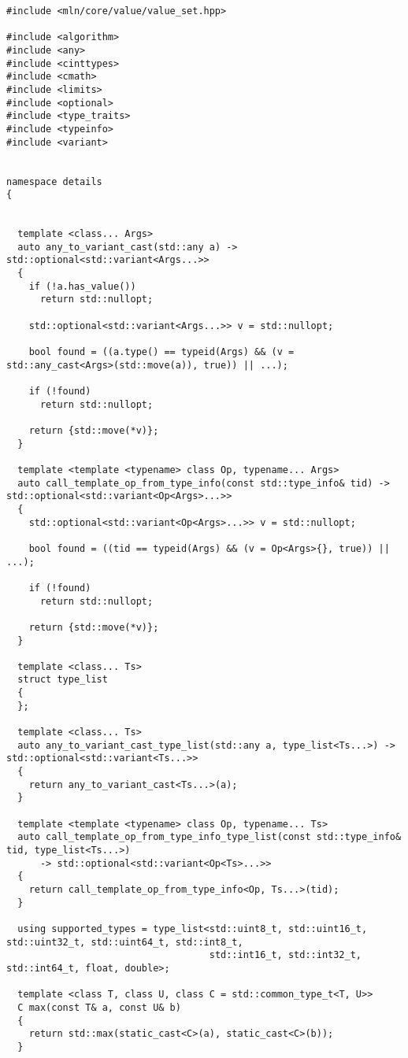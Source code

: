 \begin{verbatim}
#include <mln/core/value/value_set.hpp>

#include <algorithm>
#include <any>
#include <cinttypes>
#include <cmath>
#include <limits>
#include <optional>
#include <type_traits>
#include <typeinfo>
#include <variant>


namespace details
{


  template <class... Args>
  auto any_to_variant_cast(std::any a) -> std::optional<std::variant<Args...>>
  {
    if (!a.has_value())
      return std::nullopt;

    std::optional<std::variant<Args...>> v = std::nullopt;

    bool found = ((a.type() == typeid(Args) && (v = std::any_cast<Args>(std::move(a)), true)) || ...);

    if (!found)
      return std::nullopt;

    return {std::move(*v)};
  }

  template <template <typename> class Op, typename... Args>
  auto call_template_op_from_type_info(const std::type_info& tid) -> std::optional<std::variant<Op<Args>...>>
  {
    std::optional<std::variant<Op<Args>...>> v = std::nullopt;

    bool found = ((tid == typeid(Args) && (v = Op<Args>{}, true)) || ...);

    if (!found)
      return std::nullopt;

    return {std::move(*v)};
  }

  template <class... Ts>
  struct type_list
  {
  };

  template <class... Ts>
  auto any_to_variant_cast_type_list(std::any a, type_list<Ts...>) -> std::optional<std::variant<Ts...>>
  {
    return any_to_variant_cast<Ts...>(a);
  }

  template <template <typename> class Op, typename... Ts>
  auto call_template_op_from_type_info_type_list(const std::type_info& tid, type_list<Ts...>)
      -> std::optional<std::variant<Op<Ts>...>>
  {
    return call_template_op_from_type_info<Op, Ts...>(tid);
  }

  using supported_types = type_list<std::uint8_t, std::uint16_t, std::uint32_t, std::uint64_t, std::int8_t,
                                    std::int16_t, std::int32_t, std::int64_t, float, double>;

  template <class T, class U, class C = std::common_type_t<T, U>>
  C max(const T& a, const U& b)
  {
    return std::max(static_cast<C>(a), static_cast<C>(b));
  }


\end{verbatim}
